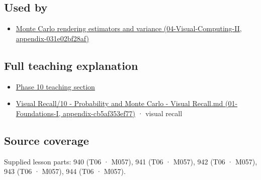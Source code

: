 \subsection{Used by}\label{used-by}

\begin{itemize}
\tightlist
\item
  \href{}{Monte Carlo rendering estimators and variance (04-Visual-Computing-II, appendix-031e02bf28af)}
\end{itemize}

\subsection{Full teaching explanation}\label{full-teaching-explanation}

\begin{itemize}
\tightlist
\item
  \href{Continuous\%20Notes/Computing\%20Foundations\%20-\%20From\%20Bits\%20to\%20C++\%20and\%20Systems\%20APIs\#7.\%20Transformations\%20turn\%20simple\%20inputs\%20into\%20useful\%20samples}{Phase 10 teaching section}
\item
  \href{}{Visual Recall/10 - Probability and Monte Carlo - Visual Recall.md (01-Foundations-I, appendix-cb5af353ef77)} · visual recall
\end{itemize}

\subsection{Source coverage}\label{source-coverage}

Supplied lesson parts: 940 (T06 · M057), 941 (T06 · M057), 942 (T06 · M057), 943 (T06 · M057), 944 (T06 · M057).
